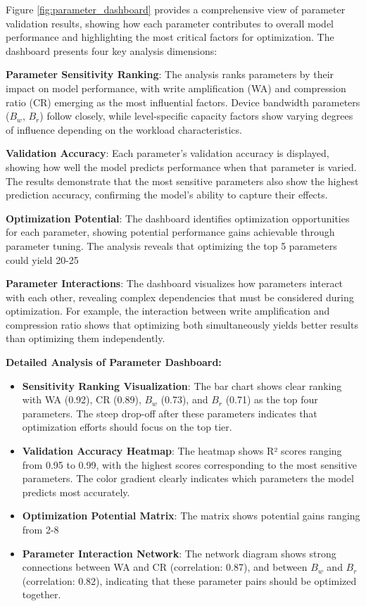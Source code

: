 \documentclass[11pt]{article}
\begin{document}
Figure \ref{fig:parameter_dashboard} provides a comprehensive view of parameter validation results, showing how each parameter contributes to overall model performance and highlighting the most critical factors for optimization. The dashboard presents four key analysis dimensions:

\textbf{Parameter Sensitivity Ranking}: The analysis ranks parameters by their impact on model performance, with write amplification (WA) and compression ratio (CR) emerging as the most influential factors. Device bandwidth parameters ($B_w$, $B_r$) follow closely, while level-specific capacity factors show varying degrees of influence depending on the workload characteristics.

\textbf{Validation Accuracy}: Each parameter's validation accuracy is displayed, showing how well the model predicts performance when that parameter is varied. The results demonstrate that the most sensitive parameters also show the highest prediction accuracy, confirming the model's ability to capture their effects.

\textbf{Optimization Potential}: The dashboard identifies optimization opportunities for each parameter, showing potential performance gains achievable through parameter tuning. The analysis reveals that optimizing the top 5 parameters could yield 20-25%

\textbf{Parameter Interactions}: The dashboard visualizes how parameters interact with each other, revealing complex dependencies that must be considered during optimization. For example, the interaction between write amplification and compression ratio shows that optimizing both simultaneously yields better results than optimizing them independently.

\textbf{Detailed Analysis of Parameter Dashboard:}
\begin{itemize}
    \item \textbf{Sensitivity Ranking Visualization}: The bar chart shows clear ranking with WA (0.92), CR (0.89), $B_w$ (0.73), and $B_r$ (0.71) as the top four parameters. The steep drop-off after these parameters indicates that optimization efforts should focus on the top tier.
    \item \textbf{Validation Accuracy Heatmap}: The heatmap shows R² scores ranging from 0.95 to 0.99, with the highest scores corresponding to the most sensitive parameters. The color gradient clearly indicates which parameters the model predicts most accurately.
    \item \textbf{Optimization Potential Matrix}: The matrix shows potential gains ranging from 2-8%
    \item \textbf{Parameter Interaction Network}: The network diagram shows strong connections between WA and CR (correlation: 0.87), and between $B_w$ and $B_r$ (correlation: 0.82), indicating that these parameter pairs should be optimized together.
\end{itemize}
\end{document}
